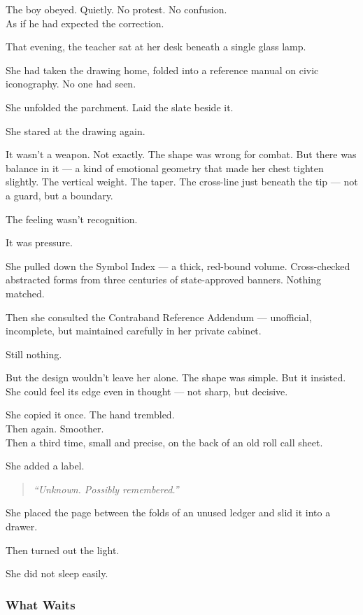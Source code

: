\documentclass[12pt]{article}
\begin{document}
The boy obeyed. Quietly. No protest. No confusion.\\
As if he had expected the correction.

\vspace{1em}

That evening, the teacher sat at her desk beneath a single glass lamp.

She had taken the drawing home, folded into a reference manual on civic iconography. No one had seen.

She unfolded the parchment. Laid the slate beside it.

She stared at the drawing again.

It wasn’t a weapon. Not exactly. The shape was wrong for combat. But there was balance in it --- a kind of emotional geometry that made her chest tighten slightly. The vertical weight. The taper. The cross-line just beneath the tip --- not a guard, but a boundary.

The feeling wasn’t recognition.

It was pressure.

She pulled down the Symbol Index --- a thick, red-bound volume. Cross-checked abstracted forms from three centuries of state-approved banners. Nothing matched.

Then she consulted the Contraband Reference Addendum --- unofficial, incomplete, but maintained carefully in her private cabinet.

Still nothing.

But the design wouldn't leave her alone. The shape was simple. But it insisted. She could feel its edge even in thought --- not sharp, but decisive.

She copied it once. The hand trembled.\\
Then again. Smoother.\\
Then a third time, small and precise, on the back of an old roll call sheet.

She added a label.

\begin{quote}
\textit{“Unknown. Possibly remembered.”}
\end{quote}

She placed the page between the folds of an unused ledger and slid it into a drawer.

Then turned out the light.

She did not sleep easily.

\dotfill

\subsubsection{What Waits}
\end{document}
